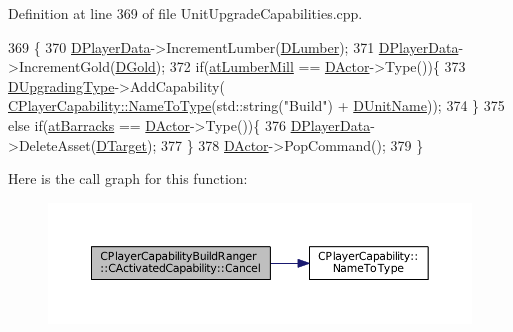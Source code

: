 Definition at line 369 of file Unit\+Upgrade\+Capabilities.\+cpp.


\begin{DoxyCode}
369                                                              \{
370     \hyperlink{classCActivatedPlayerCapability_a9bf27c322a73f4b11c8183cc1973c3d8}{DPlayerData}->IncrementLumber(\hyperlink{classCPlayerCapabilityBuildRanger_1_1CActivatedCapability_a149028982faf1d393580d5d57bf4da03}{DLumber});
371     \hyperlink{classCActivatedPlayerCapability_a9bf27c322a73f4b11c8183cc1973c3d8}{DPlayerData}->IncrementGold(\hyperlink{classCPlayerCapabilityBuildRanger_1_1CActivatedCapability_a1943b07bf35da2a475fd1bb36ca777ab}{DGold});
372     \textcolor{keywordflow}{if}(\hyperlink{GameDataTypes_8h_a5600d4fc433b83300308921974477feca7bb38316bc3193b5c9ec67ea6aad549c}{atLumberMill} == \hyperlink{classCActivatedPlayerCapability_a54ca944b47bff2718330639941d402b0}{DActor}->Type())\{
373         \hyperlink{classCPlayerCapabilityBuildRanger_1_1CActivatedCapability_a86cf7894dce398e7c5f4642e57e31682}{DUpgradingType}->AddCapability(
      \hyperlink{classCPlayerCapability_a920a696526e8a839f728192aea0ba1c5}{CPlayerCapability::NameToType}(std::string(\textcolor{stringliteral}{"Build"}) + 
      \hyperlink{classCPlayerCapabilityBuildRanger_1_1CActivatedCapability_a0914856622c9b77b9943add2491c97be}{DUnitName}));
374     \}
375     \textcolor{keywordflow}{else} \textcolor{keywordflow}{if}(\hyperlink{GameDataTypes_8h_a5600d4fc433b83300308921974477feca1cbf6c944f30d615a247eef1f57b2230}{atBarracks} == \hyperlink{classCActivatedPlayerCapability_a54ca944b47bff2718330639941d402b0}{DActor}->Type())\{
376         \hyperlink{classCActivatedPlayerCapability_a9bf27c322a73f4b11c8183cc1973c3d8}{DPlayerData}->DeleteAsset(\hyperlink{classCActivatedPlayerCapability_a8a1cf50b6501bcfd55af0c935828e395}{DTarget});
377     \}
378     \hyperlink{classCActivatedPlayerCapability_a54ca944b47bff2718330639941d402b0}{DActor}->PopCommand();
379 \}
\end{DoxyCode}
Here is the call graph for this function\+:\nopagebreak
\begin{figure}[H]
\begin{center}
\leavevmode
\includegraphics[width=350pt]{classCPlayerCapabilityBuildRanger_1_1CActivatedCapability_a46a5240502d6a8de65d3d56bbda8bf91_cgraph}
\end{center}
\end{figure}
\hypertarget{classCPlayerCapabilityBuildRanger_1_1CActivatedCapability_a5fd10074c6b25ffb36401055ed90b70b}{}\label{classCPlayerCapabilityBuildRanger_1_1CActivatedCapability_a5fd10074c6b25ffb36401055ed90b70b} 

